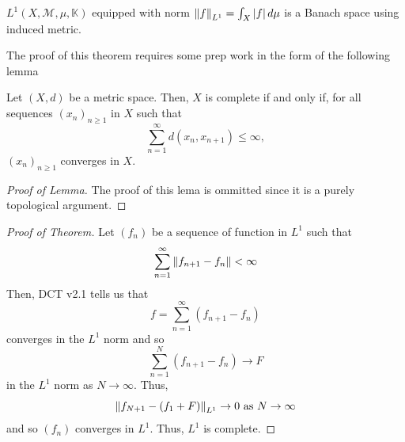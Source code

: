 \documentclass[11pt,leqno,oneside]{amsbook}
\numberwithin{thm}{section}
\newcommand{\M}{\mathcal{M}} %
\newcommand{\K}{\mathbb{K}} %
\begin{document}
\begin{thm}
  \(L^1(X,\M,\mu,\K)\) equipped with norm \(\norm[f]_{L^1} = \int_X
  |f|\d\mu\) is a Banach space using induced metric.
\end{thm}
The proof of this theorem requires some prep work in the form of the
following lemma
\begin{lem}\label{series-criterion-for-completeness}
  Let \((X,d)\) be a metric space. Then, \(X\) is complete if and only
  if, for all sequences \((x_n)_{n \geq 1}\) in \(X\) such that \[
    \sum_{n=1}^\infty d(x_n,x_{n+1}) \leq \infty,
  \]
  \((x_n)_{n \geq 1}\) converges in \(X\).
\end{lem}
\begin{proof}[Proof of Lemma]
  The proof of this lema is ommitted since it is a purely topological argument.
\end{proof}
\begin{proof}[Proof of Theorem]
  Let \((f_n)\) be a sequence of function in \(L^1\) such that \[
    \sum_{n=1}^\infty \norm[f_{n+1}-f_n] < \infty
  \]
  Then, DCT v2.1 tells us that \[
    f = \sum_{n=1}^\infty \left( f_{n+1} - f_n \right)
  \]
  converges in the \(L^1\) norm and so \[
    \sum_{n=1}^N (f_{n+1}-f_n) \to F
  \]
  in the \(L^1\) norm as \(N \to \infty\). Thus, \[
    \norm[f_{N+1} - (f_1+F)]_{L^1} \to 0 \text{ as } N \to \infty
  \]
  and so \((f_n)\) converges in \(L^1\). Thus, \(L^1\) is complete.
\end{proof}
\end{document}
